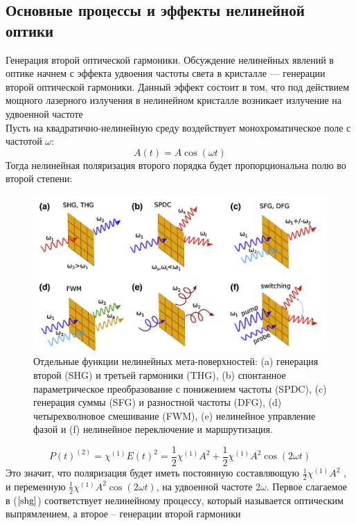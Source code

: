 \subsection{Основные процессы и эффекты нелинейной оптики}
\hspace*{2mm}Генерация второй оптической гармоники. 
Обсуждение нелинейных явлений в оптике начнем с
эффекта удвоения частоты света в кристалле — генерации второй оптической
гармоники. Данный эффект состоит в том, что под действием мощного лазерного излучения в нелинейном кристалле возникает излучение на удвоенной
частоте
\\
\hspace{2mm}
Пусть на квадратично-нелинейную среду воздействует монохроматическое поле с частотой $\omega$:
 \begin{equation}\label{shg:e(t)}
A(t) = A\cos(\omega t)
\end{equation}
Тогда нелинейная поляризация второго порядка будет пропорциональна
полю во второй степени:
 \begin{figure}[h!]
	\centering
	\includegraphics[width=1\linewidth]{images/harmonics.png}
	\caption{Отдельные функции нелинейных мета-поверхностей: (a) генерация второй (SHG) и третьей гармоники (THG), (b) спонтанное параметрическое преобразование с понижением частоты (SPDC), (c) генерация суммы (SFG) и разностной частоты (DFG), (d) четырехволновое смешивание (FWM), (e) нелинейное управление фазой и (f) нелинейное переключение и маршрутизация.}
	\label{harmonics}
\end{figure}
 \begin{equation}\label{shg}
P(t)^{(2)} = \chi^{(1)}E(t)^2 = \frac{1}{2}\chi^{(1)}A^2 + \frac{1}{2}\chi^{(1)}A^2\cos(2\omega t)
\end{equation}
Это значит, что поляризация будет иметь постоянную составляющую $ \frac{1}{2}\chi^{(1)}A^2$ , и
переменную $\frac{1}{2}\chi^{(1)}A^2\cos(2\omega t)$, на удвоенной частоте $2\omega$. Первое слагаемое в ($\ref{shg}$) соответствует нелинейному процессу, который называется оптическим выпрямлением, а второе – генерации второй гармоники




